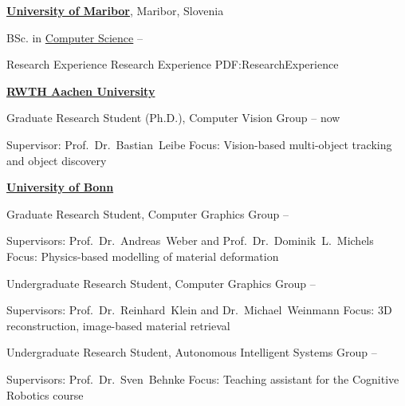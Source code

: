 \documentclass[letterpaper,MMMyyyy,nonstopmode]{simpleresumecv}
\begin{document}
\begin{Body}

\BigGap
\Entry
\href{https://www.um.si}
{\textbf{University of Maribor}},
Maribor, Slovenia

\Gap
\BulletItem
BSc. in
\href{https://feri.um.si/en/}
{Computer Science}
\hfill
{} --
\begin{Detail}
\end{Detail}


\Section
{Research Experience}
{Research Experience}
{PDF:ResearchExperience}

\Entry
\href{http://www.rwth-aachen.de}
{\textbf{RWTH Aachen University}}

\Gap
\BulletItem
Graduate Research Student (Ph.D.), Computer Vision Group
\hfill
{} -- now
\begin{Detail}
\SubBulletItem
Supervisor:
Prof.~Dr.~Bastian~Leibe
\SubBulletItem
Focus:
Vision-based multi-object tracking and object discovery
\end{Detail}

\Entry
\href{https://www.uni-bonn.de/}
{\textbf{University of Bonn}}

\Gap
\BulletItem
Graduate Research Student, Computer Graphics Group
\hfill
{} --
\begin{Detail}
\SubBulletItem
Supervisors:
Prof.~Dr.~Andreas~Weber and
Prof.~Dr.~Dominik~L.~Michels
\SubBulletItem
Focus:
Physics-based modelling of material deformation
\end{Detail}

\Gap
\BulletItem
Undergraduate Research Student, Computer Graphics Group
\hfill
{} --
\begin{Detail}
\SubBulletItem
Supervisors:
Prof.~Dr.~Reinhard~Klein and
Dr.~Michael~Weinmann
\SubBulletItem
Focus:
3D reconstruction, image-based material retrieval
\end{Detail}

\Gap
\BulletItem
Undergraduate Research Student, Autonomous Intelligent Systems Group
\hfill
{} --
\begin{Detail}
\SubBulletItem
Supervisors:
Prof.~Dr.~Sven~Behnke
\SubBulletItem
Focus:
Teaching assistant for the Cognitive Robotics course 
\end{Detail}


\end{Body}
\end{document}
